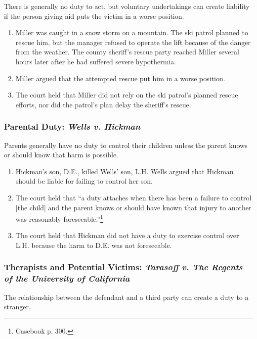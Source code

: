 There is generally no duty to act, but voluntary undertakings can create 
liability if the person giving aid puts the victim in a worse position.

\begin{enumerate}
    \item Miller was caught in a snow storm on a mountain. The ski patrol 
    planned to rescue him, but the manager refused to operate the lift because 
    of the danger from the weather. The county sheriff's rescue party reached 
    Miller several hours later after he had suffered severe hypothermia.
    \item Miller argued that the attempted rescue put him in a worse position.
    \item The court held that Miller did not rely on the ski patrol's planned 
    rescue efforts, nor did the patrol's plan delay the sheriff's rescue.
\end{enumerate}

\subsubsection{Parental Duty: \emph{Wells v. Hickman}}

Parents generally have no duty to control their children unless the parent 
knows or should know that harm is possible.

\begin{enumerate}
    \item Hickman's son, D.E., killed Wells' son, L.H.  Wells argued that 
    Hickman should be liable for failing to control her son.
    \item The court held that ``a duty attaches when there has been a failure 
    to control [the child] and the parent knows or should have known that 
    injury to another was reasonably foreseeable.''\footnote{Casebook p. 300.}
    \item The court held that Hickman did not have a duty to exercise control 
    over L.H. because the harm to D.E. was not foreseeable.
\end{enumerate}

\subsubsection{Therapists and Potential Victims: \emph{Tarasoff v. The Regents 
of the University of California}}

The relationship between the defendant and a third party can create a duty to 
a stranger.

